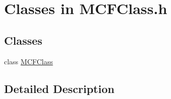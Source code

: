 \hypertarget{group___m_c_f_c_l_a_s_s___c_l_a_s_s_e_s}{}\section{Classes in M\+C\+F\+Class.\+h}
\label{group___m_c_f_c_l_a_s_s___c_l_a_s_s_e_s}
\subsection*{Classes}
\begin{DoxyCompactItemize}
\item 
class \mbox{\hyperlink{class_m_c_f_class}{M\+C\+F\+Class}}
\end{DoxyCompactItemize}


\subsection{Detailed Description}
